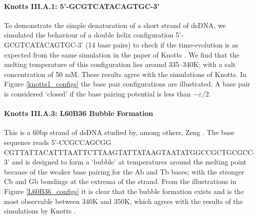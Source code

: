 \paragraph{Knotts III.A.1: 5'-GCGTCATACAGTGC-3'} To demonstrate the simple denaturation of a short strand of dsDNA, we simulated the behaviour of a double helix configuration 5'-GCGTCATACAGTGC-3' (14 base pairs) to check if the time-evolution is as expected from the same simulation in the paper of Knotts \etal \cite{knotts2007coarse}.
We find that the melting temperature of this configuration lies around 335--340K; with a salt concentration of 50 mM.
These results agree with the simulations of Knotts. In Figure \ref{knotts1_configs} the base pair configurations are illustrated. A base pair is considered `closed' if the base pairing potential is less than $-\varepsilon/2$.



\paragraph{Knotts III.A.3: L60B36 Bubble Formation} This is a 60bp strand of dsDNA studied by, among others, Zeng \etal \cite{zeng2003length}.
The base sequence reads 5'-CCGCCAGCGG CGTTATTACATTTAATTCTTAAGTATTATAAGTAATATGGCCGCTGCGCC-3' and is designed to form a `bubble' at temperatures around the melting point because of the weaker base pairing for the Ab and Tb bases; with the stronger Cb and Gb bondings at the extrema of the strand.
From the illustrations in Figure \ref{L60B36_configs} it is clear that the bubble formation exists and is the most observable between 340K and 350K, which agrees with the results of the simulations by Knotts \etal \cite{knotts2007coarse}.


